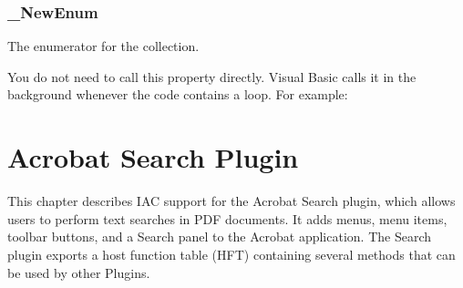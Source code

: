 \documentclass[letterpaper,12pt,english,openany,oneside]{sphinxmanual}
\begin{document}
\begin{sphinxVerbatim}[commandchars=\\\{\}]
   
   

   
   
\end{sphinxVerbatim}




\subsection{\_NewEnum}
\label{\detokenize{IAC_API_FormsIntro:newenum}}
The  enumerator for the collection.

You do not need to call this property directly. Visual Basic calls it in the background whenever the code contains a  loop. For example:

\begin{sphinxVerbatim}[commandchars=\\\{\}]
    
 
 
 
 
\end{sphinxVerbatim}
\label{\detokenize{IAC_API_FormsIntro:syntax-42}}

\begin{sphinxVerbatim}[commandchars=\\\{\}]
\PYG{p}{[}\PYG{p}{]} 
\end{sphinxVerbatim}


\chapter{Acrobat Search Plug\sphinxhyphen{}in}
\label{\detokenize{IAC_API_SearchIntro:acrobat-search-plug-in}}\label{\detokenize{IAC_API_SearchIntro::doc}}
This chapter describes IAC support for the Acrobat Search plug\sphinxhyphen{}in, which allows users to perform text searches in PDF documents. It adds menus, menu items, toolbar buttons, and a Search panel to the Acrobat application. The Search plug\sphinxhyphen{}in exports a host function table (HFT) containing several methods that can be used by other Plugins.
\end{document}
